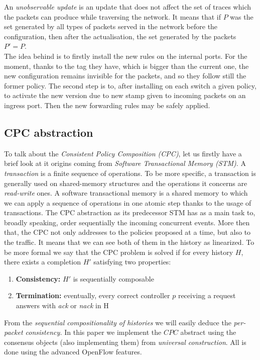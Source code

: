\documentclass{article}
\theoremstyle{remark}
\begin{document}
An \emph{unobservable update} is an update that does not affect the set of traces which the packets can produce while traversing the network. It means that if $P$ was the set generated by all types of packets served in the network before the configuration, then after the actualisation, the set generated by the packets $P'=P$.\\ 
The idea behind is to firstly install the new rules on the internal ports. For the moment, thanks to the tag they have, which is bigger than the current one, the new configuration remains invisible for the packets, and so they follow still the former policy. The second step is to, after installing on each switch a given policy, to activate the new version due to new stamp given to incoming packets on an ingress port. Then the new forwarding rules may be safely applied. 
\subsection{CPC abstraction}
To talk about the \emph{Consistent Policy Composition (CPC)}, let us firstly have a brief look at it origins coming from \emph{Software Transactional Memory (STM)}\cite{Shavit:1995:STM:224964.224987}. A \emph{transaction} is a finite sequence of operations. To be more specific, a transaction is generally used on shared-memory structures and the operations it concerns are \emph{read-write} ones. A software transactional memory is a shared memory to which we can apply a sequence of operations in one atomic step thanks to the usage of transactions.
The CPC abstraction as its predecessor STM has as a main task to, broadly speaking, order sequentially the incoming concurrent events. More then that, the CPC not only addresses to the policies proposed at a time, but also to the traffic. It means that we can see both of them in the history as linearized. To be more formal we say that the CPC problem is solved if for every history $H$, there exists a completion $H'$ satisfying two properties:
\begin{enumerate}
\item \textbf{Consistency:} $H'$ is sequentially composable
\item \textbf{Termination:} eventually, every correct controller $p$ receiving a request answers with \emph{ack} or \emph{nack} in H
\end{enumerate}
From the \emph{sequential compositionality of histories} we will easily deduce the \emph{per-packet consistency.} 
In this paper we implement the $CPC$ abstract using the consensus objects (also implementing them) from \emph{universal construction}. All is done using the advanced OpenFlow features. 
\end{document}
